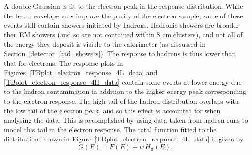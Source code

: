 A double Gaussian is fit to the electron peak in the response distribution. While the beam envelope cuts improve the purity of the electron sample, some of these events still contain showers initiated by hadrons. 
Hadronic showers are broader then EM showers (and so are not contained within 8 cm clusters), and not all of the energy they deposit is visible to the calorimeter (as discussed in Section~\ref{detector_had_showers}). The response to hadrons is thus lower than that for electrons. 
%
%
%
%
%
%
%
%
The response plots in Figures~\ref{TBplot_electron_response_4L_data} and \ref{TBplot_electron_response_4H_data} contain some events at lower energy due to the hadron contamination in addition to the higher energy peak corresponding to the electron response. The high tail of the hadron distribution overlaps with the low tail of the electron peak, and so this effect is accounted for when analysing the data. This is accomplished by using data taken from hadron runs to model this tail in the electron response. The total function fitted to the distributions shown in Figure~\ref{TBplot_electron_response_4L_data} is given by
\begin{equation}
G(E) = F(E) + w \, H_\pi(E),
\end{equation}
